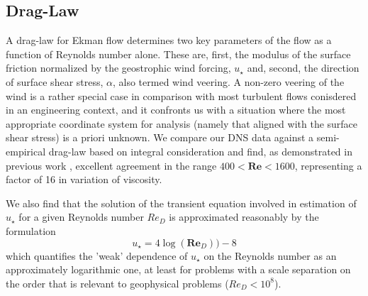 \documentclass[a4paper,11pt]{amsart}
\begin{document}
\subsection{Drag-Law}
A drag-law for Ekman flow determines two key parameters of the flow as a function of Reynolds number alone.
%
These are, first, the modulus of the surface friction normalized by the geostrophic wind forcing, $u_\star$ and,
second, the direction of surface shear stress, $\alpha$, also termed wind veering. 
%
A non-zero veering of the wind is a rather special case in comparison with most turbulent flows conisdered in an
engineering context, and it confronts us with a situation where the most appropriate coordinate system for analysis
(namely that aligned with the surface shear stress) is a priori unknown. 
%
We compare our DNS data against a semi-empirical drag-law based on integral consideration \cite{spalart:JFM1989}
and find, as demonstrated in previous work \cite{ansorge:BM2014}, excellent agreement in the range
 $400<\mathbf{Re}<1600$, representing a factor of 16 in variation of viscosity. 
%
\par
%
We also find that the solution of the transient equation involved in estimation of $u_\star$ for a given Reynolds number
$Re_D$ is approximated reasonably by the formulation
\begin{equation}
  u_\star= 4\log(\mathbf{Re}_D))-8
\end{equation}
which quantifies the 'weak' dependence of $u_\star$ on the Reynolds number as an approximately logarithmic one, at least
for problems with a scale separation on the order that is relevant to geophysical problems ($Re_D<10^{8}$).  
%
%
\end{document}
